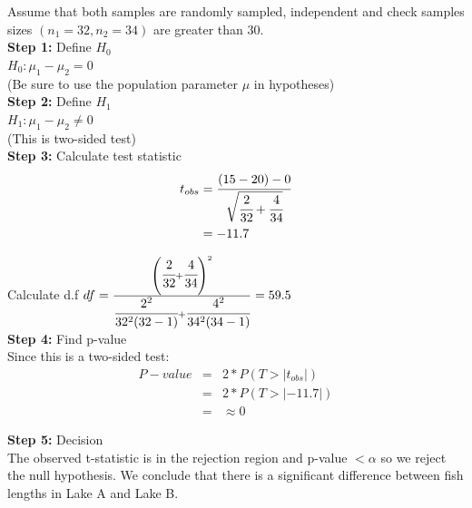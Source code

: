 \documentclass[12pt]{article}
\begin{document}
\newpage

\begin{framed}

Assume that both samples are randomly sampled, independent and check samples sizes $(n_{1} = 32, n_{2}=34)$ are greater than 30. \\

\textbf{Step 1:} Define $H_{0}$\\
$H_{0}: \mu_{1} - \mu_{2} = 0$\\
(Be sure to use the population parameter $\mu$ in hypotheses) \\

\textbf{Step 2:} Define $H_{1}$\\
$H_{1}: \mu_{1} - \mu_{2} \neq 0$\\
(This is two-sided test)\\


\textbf{Step 3:} Calculate test statistic
\begin{align*}
t_{obs} &= \cfrac{(15-20)-0}{\sqrt{\cfrac{2}{32}+\cfrac{4}{34}}} \\
&= -11.7 
\end{align*}

Calculate d.f
$df = \frac{\left(\cfrac{2}{32}+\cfrac{4}{34}\right)^{2}}{\cfrac{2^{2}}{32^{2}(32-1)}+\cfrac{4^{2}}{34^{2}(34-1)}} = 59.5$\\
  
\textbf{Step 4:} Find p-value \\
Since this is a two-sided test:\\
\begin{eqnarray*}
P-value &=& 2*P(T > |t_{obs}|) \\
&=& 2*P(T > |-11.7|) \\
&=& \approx 0
\end{eqnarray*}

\textbf{Step 5:} Decision \\
The observed t-statistic is in the rejection region and p-value $< \alpha$ so we reject the null hypothesis. We conclude that there is a significant difference between fish lengths in Lake A and Lake B.\\
\end{framed}
\end{document}
